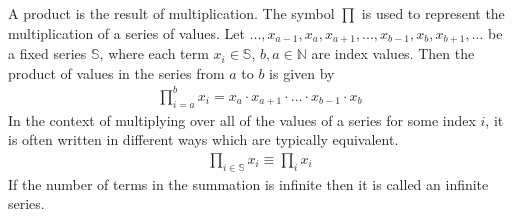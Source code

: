 \begin{defn}{1}
	A product is the result of multiplication. The symbol $\prod$ is used to represent the multiplication of a series of values. Let $..., x_{a-1}, x_a, x_{a+1}, ... ,x_{b-1}, x_b, x_{b+1}, ...$ be a fixed series $\mathbb{S}$, where each term $x_i\in\mathbb{S}$, $b, a \in \mathbb{N}$ are index values. Then the product of values in the series from $a$ to $b$ is given by
	\begin{align}
		\prod_{i=a}^{b} x_i = x_a \cdot  x_{a+1} \cdot ... \cdot x_{b-1} \cdot x_b
	\end{align}
	In the context of multiplying over all of the values of a series for some index $i$, it is often written in different ways which are typically equivalent.
	\begin{align}
		\prod_{i\in\mathbb{S}} x_i \equiv \prod_{i} x_i
	\end{align}
	If the number of terms in the summation is infinite then it is called an infinite series.
\end{defn}


